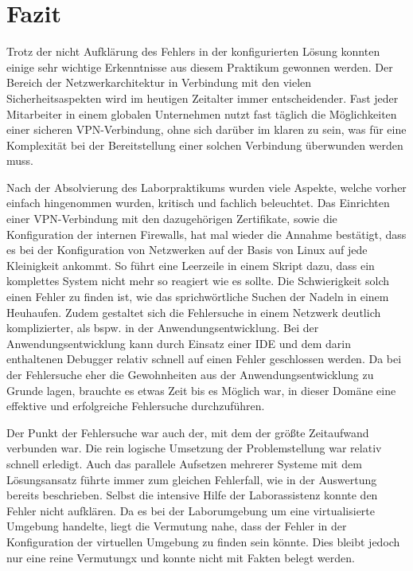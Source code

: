 \documentclass[
a4paper,     %
 headsepline, %
footsepline, %
titlepage,   %
 halfparskip,     %
 fleqn,       %
12pt         %
]{scrartcl}  %
\begin{document}
\section{Fazit}\label{Fazit}
Trotz der nicht Aufklärung des Fehlers in der konfigurierten Lösung konnten einige sehr wichtige Erkenntnisse aus diesem Praktikum gewonnen werden. Der Bereich der Netzwerkarchitektur in Verbindung mit den vielen Sicherheitsaspekten wird im heutigen Zeitalter immer entscheidender. Fast jeder Mitarbeiter in einem globalen Unternehmen nutzt fast täglich die Möglichkeiten einer sicheren VPN-Verbindung, ohne sich darüber im klaren zu sein, was für eine Komplexität bei der Bereitstellung einer solchen Verbindung überwunden werden muss. 

Nach der Absolvierung des Laborpraktikums wurden viele Aspekte, welche vorher einfach hingenommen wurden, kritisch und fachlich beleuchtet. Das Einrichten einer VPN-Verbindung mit den dazugehörigen Zertifikate, sowie die Konfiguration der internen Firewalls, hat mal wieder die Annahme bestätigt, dass es bei der Konfiguration von Netzwerken auf der Basis von Linux auf jede Kleinigkeit ankommt. So führt eine Leerzeile in einem Skript dazu, dass ein komplettes System nicht mehr so reagiert wie es sollte. Die Schwierigkeit solch einen Fehler zu finden ist, wie das sprichwörtliche Suchen der Nadeln in einem Heuhaufen. Zudem gestaltet sich die Fehlersuche in einem Netzwerk deutlich komplizierter, als bspw. in der Anwendungsentwicklung. Bei der Anwendungsentwicklung kann durch Einsatz einer IDE und dem darin enthaltenen Debugger relativ schnell auf einen Fehler geschlossen werden. Da bei der Fehlersuche eher die Gewohnheiten aus der Anwendungsentwicklung zu Grunde lagen, brauchte es etwas Zeit bis es Möglich war, in dieser Domäne eine effektive und erfolgreiche Fehlersuche durchzuführen. 

Der Punkt der Fehlersuche war auch der, mit dem der größte Zeitaufwand verbunden war. Die rein logische Umsetzung der Problemstellung war relativ schnell erledigt. Auch das parallele Aufsetzen mehrerer Systeme mit dem Lösungsansatz führte immer zum gleichen Fehlerfall, wie in der Auswertung bereits beschrieben. Selbst die intensive Hilfe der Laborassistenz konnte den Fehler nicht aufklären. Da es bei der Laborumgebung um eine virtualisierte Umgebung handelte, liegt die Vermutung nahe, dass der Fehler in der Konfiguration der virtuellen Umgebung zu finden sein könnte. Dies bleibt jedoch nur eine reine Vermutungx und konnte nicht mit Fakten belegt werden. 
\end{document}
